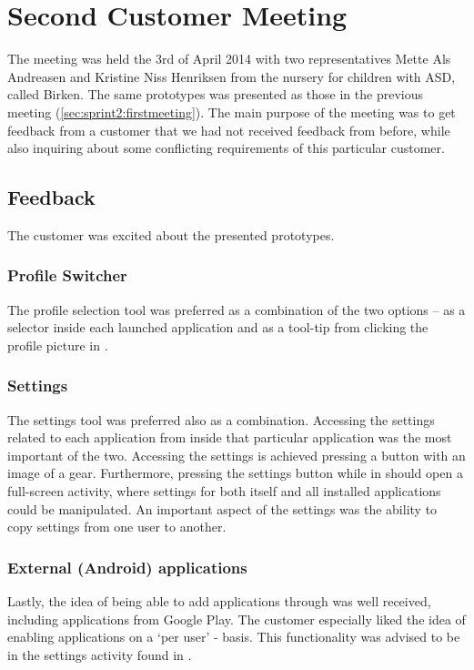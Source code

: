 \section{Second Customer Meeting}\label{sec:sprint2:secondmeeting}
The meeting was held the 3rd of April 2014 with two representatives Mette Als Andreasen and Kristine Niss Henriksen from the nursery for children with ASD, called Birken.
The same prototypes was presented as those in the previous meeting (\cref{sec:sprint2:firstmeeting}).
The main purpose of the meeting was to get feedback from a customer that we had not received feedback from before, while also inquiring about some conflicting requirements of this particular customer.

\subsection{Feedback}
The customer was excited about the presented prototypes.

\subsubsection*{Profile Switcher}
The profile selection tool was preferred as a combination of the two options -- as a selector inside each launched application and as a tool-tip from clicking the profile picture in \launcher.

\subsubsection*{Settings}
The settings tool was preferred also as a combination.
Accessing the settings related to each application from inside that particular application was the most important of the two. Accessing the settings is achieved pressing a button with an image of a gear.
Furthermore, pressing the settings button while in \launcher should open a full-screen activity, where settings for both \launcher itself and all installed applications could be manipulated.
An important aspect of the settings was the ability to copy settings from one user to another.

\subsubsection*{External (Android) applications}
Lastly, the idea of being able to add applications through \launcher was well received, including applications from Google Play.
The customer especially liked the idea of enabling applications on a `per user' - basis.
This functionality was advised to be in the settings activity found in \launcher.


